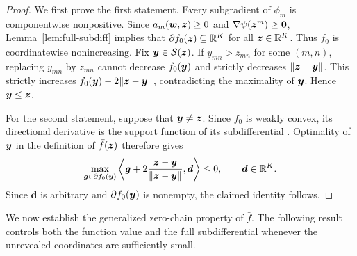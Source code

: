 \begin{proof}
We first prove the first statement. Every subgradient of $\phi_m$ is componentwise
nonpositive. Since $a_m(\bm w,\bm{z})\ge0$ and
$\nabla\psi(\bm{z}^m)\ge{\mathbf 0} $,
Lemma~\ref{lem:full-subdiff} implies that
$
 \partial f_0(\bm{z})\subseteq{\mathbb{R}}_-^K$ 
for all $\bm{z}\in{\mathbb{R}}^K$.
Thus $f_0$ is coordinatewise nonincreasing.
Fix $\bm{y}\in\mathcal S(\bm{z})$.
If $y_{mn}>z_{mn}$ for some $(m,n)$, replacing
$y_{mn}$ by $z_{mn}$ cannot decrease $f_0(\bm{y})$
and strictly decreases $\|\bm{z}-\bm{y}\|$.
This strictly increases
$f_0(\bm{y})-2\|\bm{z}-\bm{y}\|$, contradicting the maximality
of $\bm{y}$.
Hence $\bm{y}\le\bm{z}$.

For the second statement, suppose that $\bm{y}\ne\bm{z}$.
Since $f_0$ is weakly convex, its directional
derivative is the support function of its
subdifferential \cite[Fact 3]{li2020understanding}.
Optimality of $\bm{y}$ in the definition of $\bar f(\bm{z})$
therefore gives
\[
 \max_{\bm{g}\in\partial f_0(\bm{y})}
 \left\langle
 \bm{g}+2\frac{\bm{z}-\bm{y}}{\|\bm{z}-\bm{y}\|},\bm d
 \right\rangle
 \le0,
 \qquad \bm d\in{\mathbb{R}}^K.
\]
Since $\bm d$ is arbitrary and $\partial f_0(\bm{y})$
is nonempty, the claimed identity follows.
\end{proof}
We now establish the generalized zero-chain property
of $\bar f$. The following result controls both the function
value and the full subdifferential whenever the
unrevealed coordinates are sufficiently small. 

